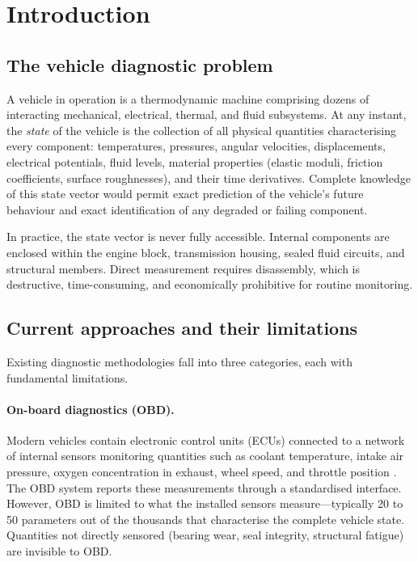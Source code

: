 \documentclass[twocolumn,10pt,a4paper]{article}
\theoremstyle{definition}
\theoremstyle{remark}
\begin{document}
\section{Introduction}\label{sec:introduction}

\subsection{The vehicle diagnostic problem}

A vehicle in operation is a thermodynamic machine comprising dozens of interacting mechanical, electrical, thermal, and fluid subsystems. At any instant, the \emph{state} of the vehicle is the collection of all physical quantities characterising every component: temperatures, pressures, angular velocities, displacements, electrical potentials, fluid levels, material properties (elastic moduli, friction coefficients, surface roughnesses), and their time derivatives. Complete knowledge of this state vector would permit exact prediction of the vehicle's future behaviour and exact identification of any degraded or failing component.

In practice, the state vector is never fully accessible. Internal components are enclosed within the engine block, transmission housing, sealed fluid circuits, and structural members. Direct measurement requires disassembly, which is destructive, time-consuming, and economically prohibitive for routine monitoring.

\subsection{Current approaches and their limitations}

Existing diagnostic methodologies fall into three categories, each with fundamental limitations.

\paragraph{On-board diagnostics (OBD).} Modern vehicles contain electronic control units (ECUs) connected to a network of internal sensors monitoring quantities such as coolant temperature, intake air pressure, oxygen concentration in exhaust, wheel speed, and throttle position \citep{SAEJ1979}. The OBD system reports these measurements through a standardised interface. However, OBD is limited to what the installed sensors measure---typically 20 to 50 parameters out of the thousands that characterise the complete vehicle state. Quantities not directly sensored (bearing wear, seal integrity, structural fatigue) are invisible to OBD.
\end{document}
